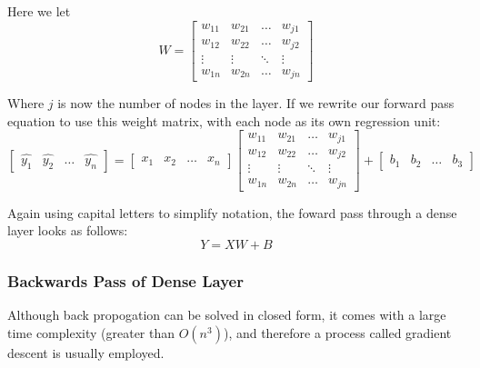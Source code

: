 \documentclass{article}
\begin{document}
    Here we let
    \begin{displaymath}
        W = \begin{bmatrix}
            w_{11} & w_{21} & \dots & w_{j1}\\
            w_{12} & w_{22} & \dots & w_{j2}\\
            \vdots & \vdots & \ddots & \vdots\\
            w_{1n} & w_{2n} & \dots & w_{jn}
        \end{bmatrix}
    \end{displaymath}

    Where $j$ is now the number of nodes in the layer. If we rewrite our forward pass equation to use this weight matrix,
    with each node as its own regression unit:
    \begin{displaymath}
        \begin{bmatrix}
            \hat{y_1}&
            \hat{y_2}&
            \hdots&
            \hat{y_n}
        \end{bmatrix} = \begin{bmatrix}
            x_1&
            x_2&
            \hdots&
            x_n
        \end{bmatrix} \begin{bmatrix}
            w_{11} & w_{21} & \dots & w_{j1}\\
            w_{12} & w_{22} & \dots & w_{j2}\\
            \vdots & \vdots & \ddots & \vdots\\
            w_{1n} & w_{2n} & \dots & w_{jn}
        \end{bmatrix} + \begin{bmatrix}
           b_1 & b_2 & \dots & b_3
        \end{bmatrix}
    \end{displaymath}

    Again using capital letters to simplify notation, the foward pass through a dense layer looks as follows:
    \begin{displaymath}
        Y = XW + B
    \end{displaymath}

    \subsubsection{Backwards Pass of Dense Layer}
    Although back propogation can be solved in closed form, it comes with a large time complexity (greater than $O(n^3)$), and therefore
    a process called gradient descent is usually employed.
\end{document}
